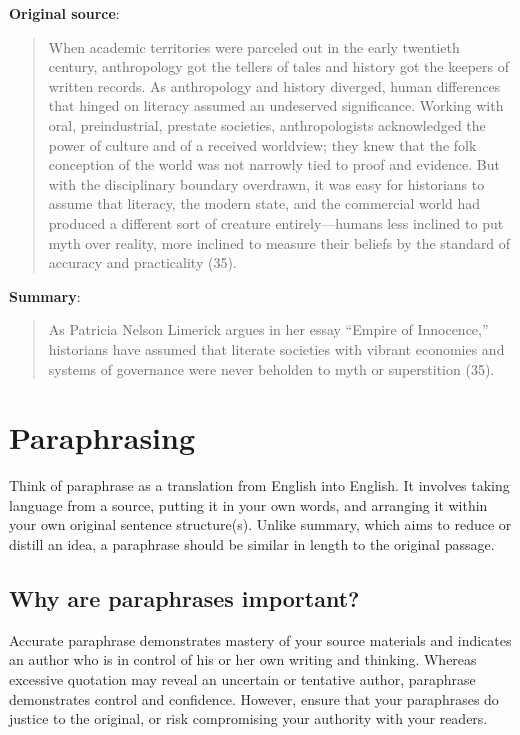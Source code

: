 \textbf{Original source}:
\begin{quote}
When academic territories were parceled out in the early twentieth century, anthropology got the tellers of tales and history got the keepers of written records.  As anthropology and history diverged, human differences that hinged on literacy assumed an undeserved significance.  Working with oral, preindustrial, prestate societies, anthropologists acknowledged the power of culture and of a received worldview; they knew that the folk conception of the world was not narrowly tied to proof and evidence.  But with the disciplinary boundary overdrawn, it was easy for historians to assume that literacy, the modern state, and the commercial world had produced a different sort of creature entirely—humans less inclined to put myth over reality, more inclined to measure their beliefs by the standard of accuracy and practicality (35).
\end{quote}

\textbf{Summary}:

\begin{quote}
As Patricia Nelson Limerick argues in her essay “Empire of Innocence,” historians have assumed that literate societies with vibrant economies and systems of governance were never beholden to myth or superstition (35).
\end{quote}



\section{Paraphrasing}

Think of paraphrase as a translation from English into English. It involves taking 
language from a source, putting it in your own words, and arranging it within your own original 
sentence structure(s). Unlike summary, which aims to reduce or distill an idea, a paraphrase should 
be similar in length to the original passage.

\subsection{Why are paraphrases important?}

Accurate paraphrase demonstrates mastery of your source materials and indicates an author
who is in control of his or her own writing and thinking. Whereas excessive quotation may reveal
an uncertain or tentative author, paraphrase demonstrates control and confidence. However, 
ensure that your paraphrases do justice to the original, or risk compromising your authority
with your readers.

